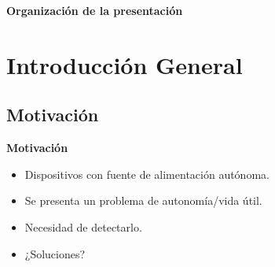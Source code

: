 \documentclass[aspectratio=43, handout]{beamer}
\begin{document}

\begin{frame}{\textbf{\LARGE{Organización de la presentación}}}
\fontsize{13pt}{13}\selectfont
  \tableofcontents
\end{frame}
%
%

\section{Introducción General}

\subsection[Motivación]{Motivación}

\begin{frame}{\textbf{\LARGE{Motivación}}}
\fontsize{16pt}{16}\selectfont
	\begin{itemize}
		\item Dispositivos con fuente de alimentación autónoma.
		\vspace{10px}
		\item Se presenta un problema de autonomía/vida útil.
		\vspace{10px}
		\item Necesidad de detectarlo.
		\vspace{10px}
		\item ¿Soluciones?
	\end{itemize}
\end{frame}
\end{document}
